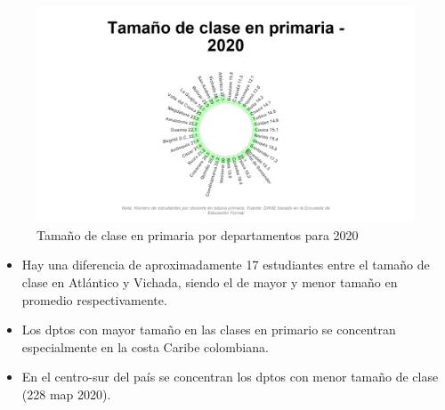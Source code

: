     \begin{figure}[H]
        \caption{Tamaño de clase en primaria por departamentos para 2020 \label{map_result_2} }
        \begin{center}
        \includegraphics[width=\textwidth,keepaspectratio]{img/var_228_static.png}
        \end{center}
    \end{figure}
            \begin{itemize}
                \item Hay una diferencia de aproximadamente 17 estudiantes entre el tamaño de clase en Atlántico y Vichada, siendo el de mayor y menor tamaño en promedio respectivamente.
                \item Los dptos con mayor tamaño en las clases en primario se concentran especialmente en la costa Caribe colombiana.
                \item En el centro-sur del país se concentran los dptos con menor tamaño de clase (228 map 2020).
                \end{itemize}

